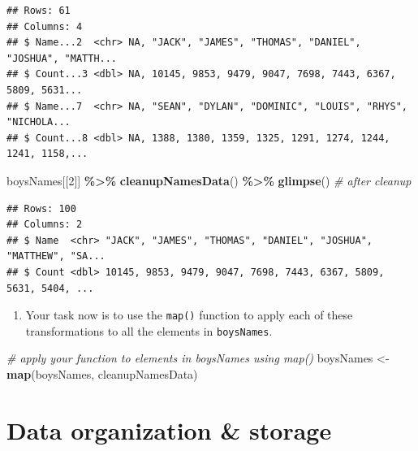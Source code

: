\documentclass[
]{book}
\newenvironment{Shaded}{\begin{snugshade}}{\end{snugshade}}
\newcommand{\CommentTok}[1]{\textcolor[rgb]{0.56,0.35,0.01}{\textit{#1}}}
\newcommand{\DecValTok}[1]{\textcolor[rgb]{0.00,0.00,0.81}{#1}}
\newcommand{\KeywordTok}[1]{\textcolor[rgb]{0.13,0.29,0.53}{\textbf{#1}}}
\newcommand{\NormalTok}[1]{#1}
\newcommand{\OperatorTok}[1]{\textcolor[rgb]{0.81,0.36,0.00}{\textbf{#1}}}
\newcommand{\StringTok}[1]{\textcolor[rgb]{0.31,0.60,0.02}{#1}}
\providecommand{\tightlist}{%
  \setlength{\itemsep}{0pt}\setlength{\parskip}{0pt}}
\begin{document}
\begin{alert}
\begin{verbatim}
## Rows: 61
## Columns: 4
## $ Name...2  <chr> NA, "JACK", "JAMES", "THOMAS", "DANIEL", "JOSHUA", "MATTH...
## $ Count...3 <dbl> NA, 10145, 9853, 9479, 9047, 7698, 7443, 6367, 5809, 5631...
## $ Name...7  <chr> NA, "SEAN", "DYLAN", "DOMINIC", "LOUIS", "RHYS", "NICHOLA...
## $ Count...8 <dbl> NA, 1388, 1380, 1359, 1325, 1291, 1274, 1244, 1241, 1158,...
\end{verbatim}

\begin{Shaded}
\begin{Highlighting}[]
\NormalTok{boysNames[[}\DecValTok{2}\NormalTok{]] }\OperatorTok{\%\textgreater{}\%}\StringTok{ }\KeywordTok{cleanupNamesData}\NormalTok{() }\OperatorTok{\%\textgreater{}\%}\StringTok{ }\KeywordTok{glimpse}\NormalTok{() }\CommentTok{\# after cleanup}
\end{Highlighting}
\end{Shaded}

\begin{verbatim}
## Rows: 100
## Columns: 2
## $ Name  <chr> "JACK", "JAMES", "THOMAS", "DANIEL", "JOSHUA", "MATTHEW", "SA...
## $ Count <dbl> 10145, 9853, 9479, 9047, 7698, 7443, 6367, 5809, 5631, 5404, ...
\end{verbatim}

\begin{enumerate}
\def\labelenumi{\arabic{enumi}.}
\setcounter{enumi}{1}
\tightlist
\item
  Your task now is to use the \texttt{map()} function to apply each of these transformations to all the elements in \texttt{boysNames}.
\end{enumerate}

\begin{Shaded}
\begin{Highlighting}[]
\CommentTok{\# apply your function to elements in \textasciigrave{}boysNames\textasciigrave{} using \textasciigrave{}map()\textasciigrave{}}
\NormalTok{boysNames \textless{}{-}}\StringTok{ }\KeywordTok{map}\NormalTok{(boysNames, cleanupNamesData)}
\end{Highlighting}
\end{Shaded}

\end{alert}

\hypertarget{data-organization-storage}{%
\section{Data organization \& storage}\label{data-organization-storage}}
\end{document}
